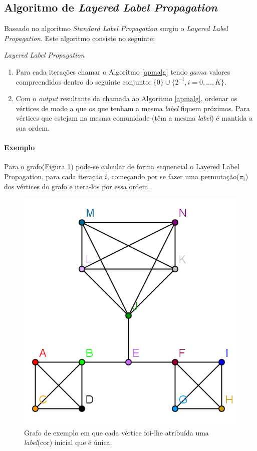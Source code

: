   \subsection{Algoritmo de \textit{Layered Label Propagation}}
  Baseado no algoritmo \textit{Standard Label Propagation} surgiu o \textit{Layered Label Propagation}. Este algoritmo consiste no seguinte:
  
  \begin{algorithm}[H]
    \caption{\textit{Layered Label Propagation}}\label{llpalg}
    \begin{enumerate}
    \item Para cada iterações chamar o Algoritmo \ref{apmalg} tendo $gama$ valores compreendidos dentro do seguinte conjunto: $\{0\}\cup\{2^{{-}i},i=0,...,K\} $.
    \item Com o \textit{output} resultante da chamada ao Algoritmo \ref{apmalg}, ordenar os vértices de modo a que os que tenham a mesma \textit{label} fiquem próximos. Para vértices que estejam na mesma comunidade (têm a mesma \textit{label}) é mantida a sua ordem.
    \end{enumerate} 
  \end{algorithm}
  
  \paragraph{Exemplo} Para o grafo(Figura \ref{graph0llp}) pode-se calcular de forma sequencial o Layered Label Propagation, para cada iteração $i$, começando por se fazer uma permutação($\pi_i$) dos vértices do grafo e itera-los por essa ordem. 
  
  \begin{figure}[H]
    \center
    \includegraphics{graph_step0.png}
    \caption{Grafo de exemplo em que cada vértice foi-lhe atribuída uma \textit{label}(cor) inicial que é única.}
    \label{graph0llp}
  \end{figure}
  
